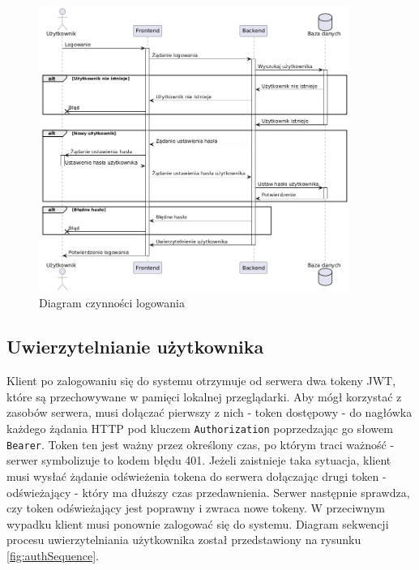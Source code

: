 \begin{figure}[H]
    \centering
    \includegraphics[width=0.9\textwidth]{graf/loginSequence.png}
    \caption{Diagram czynności logowania}
    \label{fig:login}
\end{figure}

\subsection{Uwierzytelnianie użytkownika}

Klient po zalogowaniu się do systemu otrzymuje od serwera dwa tokeny JWT, które są przechowywane w pamięci lokalnej przeglądarki. Aby mógł korzystać z zasobów serwera, musi dołączać pierwszy z nich - token dostępowy - do nagłówka każdego żądania HTTP pod kluczem \texttt{Authorization} poprzedzając go słowem \texttt{Bearer}. Token ten jest ważny przez określony czas, po którym traci ważność - serwer symbolizuje to kodem błędu 401. Jeżeli zaistnieje taka sytuacja, klient musi wysłać żądanie odświeżenia tokena do serwera dołączając drugi token - odświeżający - który ma dłuższy czas przedawnienia. Serwer następnie sprawdza, czy token odświeżający jest poprawny i zwraca nowe tokeny. W przeciwnym wypadku klient musi ponownie zalogować się do systemu. Diagram sekwencji procesu uwierzytelniania użytkownika został przedstawiony na rysunku \ref{fig:authSequence}.

